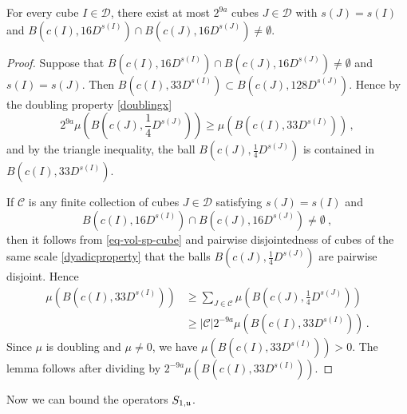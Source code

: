 \begin{lemma}
    \label{boundary-overlap}
    \leanok
    For every cube $I \in \mathcal{D}$, there exist at most $2^{9a}$ cubes $J \in \mathcal{D}$ with $s(J) = s(I)$ and $B(c(I), 16D^{s(I)}) \cap B(c(J), 16 D^{s(J)}) \ne \emptyset$.
\end{lemma}

\begin{proof}
    \leanok
    Suppose that $B(c(I), 16 D^{s(I)}) \cap B(c(J), 16 D^{s(J)}) \ne \emptyset$ and $s(I) = s(J)$. Then $B(c(I), 33 D^{s(I)}) \subset B(c(J), 128 D^{s(J)})$. Hence by the doubling property \eqref{doublingx}
    $$
        2^{9a}\mu(B(c(J), \frac{1}{4}D^{s(J)})) \ge \mu(B(c(I), 33 D^{s(I)}))\,,
    $$
    and by the triangle inequality, the ball $B(c(J), \frac{1}{4}D^{s(J)})$ is contained in $B(c(I), 33 D^{s(I)})$.

    If $\mathcal{C}$ is any finite collection of cubes $J \in \mathcal{D}$ satisfying $s(J) = s(I)$ and
    \begin{equation*}
        B(c(I), 16 D^{s(I)}) \cap B(c(J), 16 D^{s(J)}) \ne\emptyset\ ,
    \end{equation*} then it follows from \eqref{eq-vol-sp-cube} and pairwise disjointedness of cubes of the same scale \eqref{dyadicproperty} that the balls $B(c(J), \frac{1}{4} D^{s(J)})$ are pairwise disjoint. Hence
    \begin{align*}
        \mu(B(c(I), 33 D^{s(I)})) &\ge \sum_{J \in \mathcal{C}} \mu(B(c(J), \frac{1}{4}D^{s(J)}))\\
        &\ge |\mathcal{C}| 2^{-9a} \mu(B(c(I), 33 D^{s(I)}))\,.
    \end{align*}
    Since $\mu$ is doubling and $\mu \ne 0$, we have $\mu(B(c(I), 33D^{s(I)})) > 0$. The lemma follows after dividing by $2^{-9a}\mu(B(c(I), 33D^{s(I)}))$.
\end{proof}

Now we can bound the operators $S_{1, {\mathfrak u}}$.


